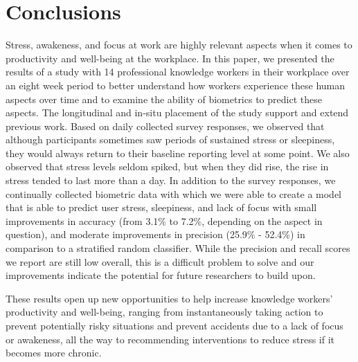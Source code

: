 \section{Conclusions} 
Stress, awakeness, and focus at work are highly relevant aspects when
it comes to productivity and well-being at the workplace. In this
paper, we presented the results of a study with 14 professional
knowledge workers in their workplace over an eight week period to
better understand how workers experience these human aspects over time and to
examine the ability of biometrics to predict these aspects. The longitudinal and in-situ placement of
the study support and extend previous work. Based on
daily collected survey responses, we observed that
although participants sometimes saw periods of sustained stress or sleepiness,
they would always return to their baseline reporting level
at some point. We also observed that stress levels seldom spiked,
but when they did rise, the rise in stress tended to last more
than a day. In addition to the survey responses, we 
continually collected
biometric data with which we were able to create a model that is able to
predict user stress, sleepiness, and lack of focus with small improvements in accuracy (from 3.1\% to 7.2\%, depending on the aspect in question), and moderate improvements in precision (25.9\% - 52.4\%) in comparison to a stratified random classifier. While the precision and recall scores we report are still low overall, this is a difficult problem to solve and our improvements indicate the potential for future researchers to build upon.

These results open up new opportunities to help increase knowledge
workers' productivity and well-being, ranging from instantaneously
taking action to prevent potentially risky situations and prevent
accidents due to a lack of focus or awakeness, all the way to
recommending interventions to reduce stress if it becomes more
chronic.




